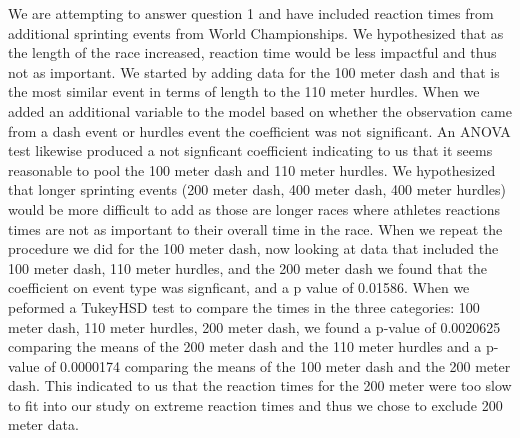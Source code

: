 \documentclass[12pt]{article}
\begin{document}
We are attempting to answer question 1 and have included reaction times from
additional sprinting events from World Championships.  We hypothesized that
as the length of the race increased, reaction time would be less impactful and
thus not as important. We started by adding data for the 100 meter dash and that
is the most similar event in terms of length to the 110 meter hurdles.  When we
added an additional variable to the model based on whether the observation came
from a dash event or hurdles event the coefficient was not significant.  An 
ANOVA test likewise produced a not signficant coefficient indicating to us that
it seems reasonable to pool the 100 meter dash and 110 meter hurdles.  We
hypothesized that longer sprinting events (200 meter dash, 400 meter dash, 400
meter hurdles) would be more difficult to add as those are longer races where
athletes reactions times are not as important to their overall time in the race.
When we repeat the procedure we did for the 100 meter dash, now looking at data
that included the 100 meter dash, 110 meter hurdles, and the 200 meter dash we
found that the coefficient on event type was signficant, and a p value of 0.01586.
When we peformed a TukeyHSD test to compare the times in the three categories:
100 meter dash, 110 meter hurdles, 200 meter dash, we found a p-value of
0.0020625 comparing the means of the 200 meter dash and the 110 meter hurdles
and a p-value of 0.0000174 comparing the means of the 100 meter dash and the 200
meter dash.  This indicated to us that the reaction times for the 200 meter were
too slow to fit into our study on extreme reaction times and thus we chose to
exclude 200 meter data.
\end{document}
